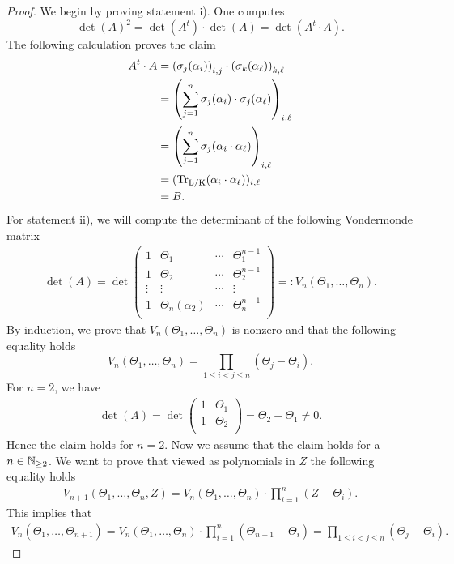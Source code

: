 \begin{proof}
	We begin by proving statement i). One computes
	$$\det(A)^2=\det(A^t)\cdot\det(A)=\det(A^t\cdot A).$$
	The following calculation proves the claim
	\begin{align*}
		A^t\cdot A&=\left( \sigma_j(\alpha_i)\right) _{i,j}\cdot\left( \sigma_k(\alpha_\ell)\right) _{k,\ell}\\
		&=\left( \sum_{j=1}^{n} \sigma_j(\alpha_i)\cdot \sigma_j(\alpha_\ell)\right) _{i,\ell}\\
		&=\left( \sum_{j=1}^{n} \sigma_j(\alpha_i\cdot\alpha_\ell)\right) _{i,\ell}\\
		&=(\operatorname{\operatorname{Tr}_{L/K}}(\alpha_i\cdot\alpha_\ell))_{i,\ell}\\
		&=B.
	\end{align*}
	For statement ii), we will compute the determinant of the following Vondermonde matrix
	\begin{align*}
	\det(A)=\det\begin{pmatrix}
	1 & \Theta_1 &\cdots& \Theta_1^{n-1} \\
	1 & \Theta_2 & \cdots& \Theta_2^{n-1} \\
	\vdots &\vdots &\cdots&\vdots\\
	1 & \Theta_n(\alpha_2) &\cdots& \Theta_n^{n-1} \\
	\end{pmatrix}
	=:V_n(\Theta_1,\dots,\Theta_n).
	\end{align*}
	By induction, we prove that $V_n(\Theta_1,\dots,\Theta_n)$ is nonzero and that the following equality holds
	$$V_n(\Theta_1,\dots,\Theta_n)=\prod_{1\le i<j\le n} (\Theta_j-\Theta_i).$$ 
	For $n=2$, we have
		\begin{align*}
		\det(A)=\det\begin{pmatrix}
		1 & \Theta_1 \\
		1 & \Theta_2 \\
		\end{pmatrix}
		=\Theta_2-\Theta_1\neq 0.
		\end{align*}
	Hence the claim holds for $n=2$. Now we assume that the claim holds for a $n\in\mathbb{N}_{\ge 2}$. We want to prove that viewed as polynomials in $Z$ the following equality holds \begin{align}\label{eq vandermonde}
		V_{n+1}(\Theta_1,\dots,\Theta_{n},Z)=V_n(\Theta_1,\dots,\Theta_n)\cdot\prod_{i=1}^{n}(Z-\Theta_i).
	\end{align}
	This implies that 
	\begin{align*}
		V_n(\Theta_1,\dots,\Theta_{n+1})=V_n(\Theta_1,\dots,\Theta_n)\cdot\prod_{i=1}^{n}(\Theta_{n+1}-\Theta_i)=\prod_{1\le i<j\le n} (\Theta_j-\Theta_i).

\end{align*}
\end{proof}
